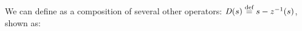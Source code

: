 %
%

%
%


%
%

We can define  as a composition of
several other operators: $\D(s) \defn s - \zm(s)$, shown as:

